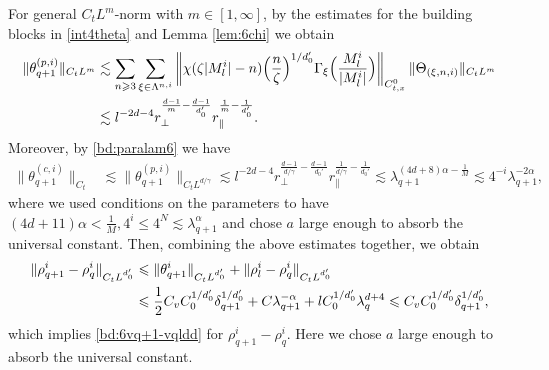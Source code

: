 \documentclass[UTF-8,reqno]{amsart}
\numberwithin{equation}{section}
\theoremstyle{definition}
\def\({{\Big(}}
\def\){{\Big)}}
\newcommand{\norm}[1]{\left\|#1\right\|}
\def\geq{\geqslant}
\def\leq{\leqslant}
\def\({{\Big(}}
\def\){{\Big)}}
\def\geq{\geqslant}
\def\leq{\leqslant}
\begin{document}
For general $C_tL^m$-norm with $m\in[1,\infty]$, by the estimates for the building blocks in \eqref{int4theta}  and Lemma \ref{lem:6chi} we obtain
\begin{align}
\|\theta_{q+1}^{(p,i)} \|_{C_tL^{m}}&\lesssim\sum_{n\geq3}\sum_{\xi\in\Lambda^{n,i}}\norm{\chi(\zeta|M^{i}_l|-n)\(\frac{n}{\zeta}\)^{1/d_0'}\Gamma_{\xi}\(\frac{M^{i}_l}{|M^{i}_l|}\)}_{C_{t,x}^0}\|\Theta_{(\xi,n,i)} \|_{C_tL^{m}}\notag\\ 
&\lesssim l^{-2d-4}r_\perp^{\frac{d-1}{m}-\frac{d-1}{d_0'}} r_\parallel^{\frac{1}{m}-\frac{1}{d_0'}}.\label{bd:6theq+1plp}
\end{align}
Moreover, by   \eqref{bd:paralam6} we have
\begin{align}
\|\theta_{q+1}^{(c,i)} \|_{C_t}&\lesssim\|\theta_{q+1}^{(p,i)} \|_{C_tL^{d/\gamma}}
\lesssim l^{-2d-4}r_\perp^{\frac{d-1}{d/\gamma}-\frac{d-1}{d_0'}} r_\parallel^{\frac1{d/\gamma}-\frac{1}{d_0'}}\lesssim  \lambda_{q+1}^{(4d+8)\alpha-\frac1M}\lesssim4^{-i} \lambda_{q+1}^{-2\alpha},\label{bd:6theq+1clp}
\end{align}
where we used  conditions on the parameters to have $(4d+11)\alpha<\frac1{M},4^i\leq4^{N}\lesssim\lambda_{q+1}^{\alpha}$ and chose $a$ large enough to absorb the universal constant.
Then, combining the above estimates together, we obtain
\begin{align}
\|\rho^{i}_{q+1}-\rho^{i}_q\|_{C_tL^{d_0'}}
&\leq\|\theta^{i}_{q+1}\|_{C_tL^{d_0'}}+\|\rho^{i}_{l}-\rho^{i}_q\|_{C_tL^{d_0'}}\notag\\
&\leq\frac12 C_v C_0^{1/{d_0'}} \delta_{q+1}^{1/{d_0'}}+C\lambda_{q+1}^{-\alpha}+lC_0^{1/{d_0'}}\lambda_q^{d+4}\leq C_v C_0^{1/{d_0'}}\delta_{q+1}^{1/{d_0'}},\notag
\end{align}
which implies \eqref{bd:6vq+1-vqldd} for $\rho^{i}_{q+1}-\rho_q^i$. Here we chose $a$ large enough to absorb the universal constant.  
\end{document}
